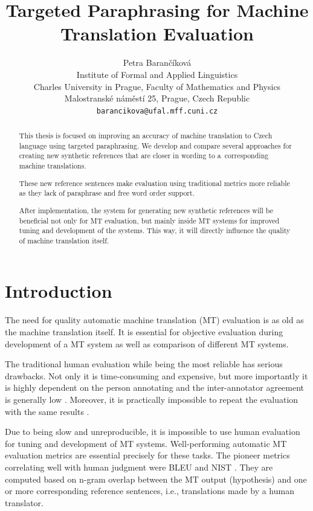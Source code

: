 \documentclass[11pt]{article}
\title{Targeted Paraphrasing for Machine Translation Evaluation}
\author{Petra Barančíková \\
  Institute of Formal and Applied Linguistics \\
  Charles University in Prague, Faculty of Mathematics and Physics\\
  Malostranské náměstí 25, Prague, Czech Republic \\
  {\tt barancikova@ufal.mff.cuni.cz} \\}
\date{}
\begin{document}
\maketitle
\begin{abstract}
This thesis is focused on improving an accuracy of machine translation to 
Czech language using targeted paraphrasing. We develop and compare several 
approaches for creating new synthetic references that are closer in wording to 
a~corresponding machine translations. 

These new reference sentences make evaluation using traditional metrics 
more reliable as they lack of paraphrase and free word order support.

After implementation, the system for generating new synthetic references will 
be beneficial not only for MT evaluation, but mainly inside MT systems for 
improved tuning and development of the systems. This way, it will directly 
influence the quality of machine translation itself.

\end{abstract}

\section{Introduction}
The need for quality automatic machine translation (MT) evaluation is as old as
the machine translation itself. It is essential for objective evaluation during
development of a MT system as well as comparison of different MT systems.

The traditional human evaluation while being the most reliable has serious 
drawbacks. Not only it is time-consuming and expensive, but more importantly
it is highly dependent on the person annotating and the inter-annotator 
agreement is generally low  \cite{wmt13}. Moreover, it is practically 
impossible to repeat the evaluation with the same results \cite{bojar-kniha}.

Due to being slow and unreproducible, it is impossible to use human evaluation
for tuning and development of MT systems. Well-performing automatic MT 
evaluation metrics are essential precisely for these tasks. The pioneer metrics 
correlating well with human judgment were BLEU \cite{bleu} and NIST \cite{nist}. 
They are computed based on n-gram overlap between the MT output (hypothesis) and 
one or more corresponding reference sentences, i.e., translations made by a human 
translator.
\end{document}
